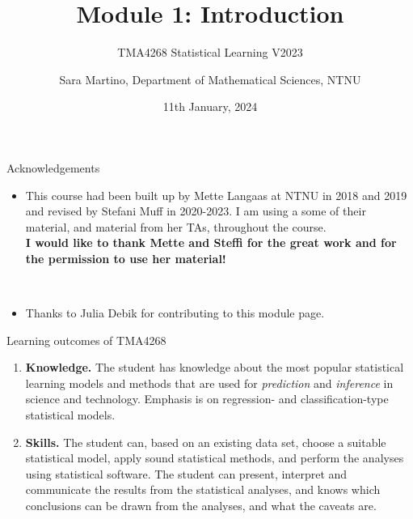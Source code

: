 \documentclass[
  10pt,
  ignorenonframetext,
]{beamer}
\title{Module 1: Introduction}
\subtitle{TMA4268 Statistical Learning V2023}
\author{Sara Martino, Department of Mathematical Sciences, NTNU}
\date{11th January, 2024}
\providecommand{\tightlist}{%
  \setlength{\itemsep}{0pt}\setlength{\parskip}{0pt}}
\begin{document}
\frame{\titlepage}

\begin{frame}{Acknowledgements}
\protect\hypertarget{acknowledgements}{}
\begin{itemize}
\tightlist
\item
  This course had been built up by Mette Langaas at NTNU in 2018 and
  2019 and revised by Stefani Muff in 2020-2023. I am using a some of
  their material, and material from her TAs, throughout the course.\\
  \vspace{2mm} \textbf{I would like to thank Mette and Steffi for the
  great work and for the permission to use her material!}
\end{itemize}

\(~\)

\begin{itemize}
\tightlist
\item
  Thanks to Julia Debik for contributing to this module page.
\end{itemize}
\end{frame}

\begin{frame}{Learning outcomes of TMA4268}
\protect\hypertarget{learning-outcomes-of-tma4268}{}
\begin{enumerate}
\item
  \textbf{Knowledge.} The student has knowledge about the most popular
  statistical learning models and methods that are used for
  \emph{prediction} and \emph{inference} in science and technology.
  Emphasis is on regression- and classification-type statistical models.
\item
  \textbf{Skills.} The student can, based on an existing data set,
  choose a suitable statistical model, apply sound statistical methods,
  and perform the analyses using statistical software. The student can
  present, interpret and communicate the results from the statistical
  analyses, and knows which conclusions can be drawn from the analyses,
  and what the caveats are.
\end{enumerate}
\end{frame}
\end{document}
